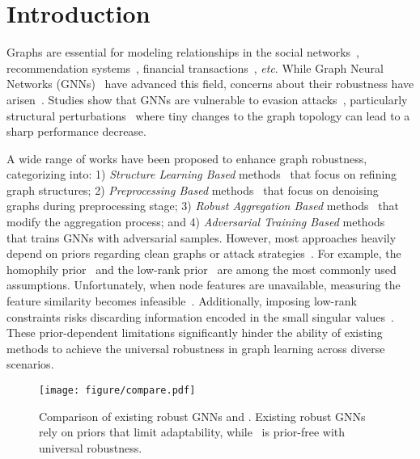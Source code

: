\section{Introduction}
Graphs are essential for modeling relationships in the social networks~\cite{zhou2023hierarchical}, recommendation systems~\cite{wu2022graph}, financial transactions~\cite{chen2022antibenford}, \textit{etc}.
While Graph Neural Networks (GNNs)~\cite{kipf2016semi} have advanced this field, concerns about their robustness have arisen~\cite{zhu2019robust, zhang2024can, jin2020graph}. 
Studies show that GNNs are vulnerable to evasion attacks~\cite{sun2022adversarial}, particularly structural perturbations~\cite{zugner2018adversarial, zhang2024can} where tiny changes to the graph topology can lead to a sharp performance decrease.

A wide range of works have been proposed to enhance graph robustness, categorizing into: 1) \textit{Structure Learning Based} methods~\cite{zhao2023self, in2024self, deng2022garnet} that focus on refining graph structures; 2) \textit{Preprocessing Based} methods~\cite{entezari2020all, wu2019adversarial} that focus on denoising graphs during preprocessing stage; 3) \textit{Robust Aggregation Based} methods~\cite{chen2021understanding, zhu2019robust, tang2020transferring, geisler2021robustness} that modify the aggregation process; and 4) \textit{Adversarial Training Based} methods~\cite{xu2019topology} that trains GNNs with adversarial samples.
However, most approaches heavily depend on priors regarding clean graphs or attack strategies~\cite{in2024self}. For example, the homophily prior~\cite{jin2021node,zhang2020gnnguard,zhao2023self,in2023similarity} and the low-rank prior~\cite{entezari2020all, xu2021speedup, lu2022robust, jin2020graph} are among the most commonly used assumptions. Unfortunately, when node features are unavailable, measuring the feature similarity becomes infeasible~\cite{in2024self}. Additionally, imposing low-rank constraints risks discarding information encoded in the small singular values~\cite{deng2022garnet}. 
These prior-dependent limitations significantly hinder the ability of existing methods to achieve the universal robustness in graph learning across diverse scenarios.

\begin{figure}[!t]
\centering
\texttt{[image: figure/compare.pdf]}
\vspace{-1.8em}
\caption{Comparison of existing robust GNNs and \ModelName.
Existing robust GNNs rely on priors that limit adaptability, while \ModelName\ is prior-free with universal robustness.
}
\label{fig:compare}
\vspace{-2.3em}
\end{figure}

